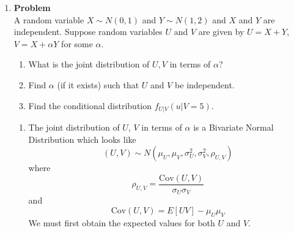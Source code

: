 \documentclass[12pt]{article}
\newenvironment{Ex}{\textbf{Problem}\vspace{.75em}\\}{}
\begin{document}
\begin{enumerate}
\begin{Ex}
\begin{solution}
\begin{enumerate}
\begin{equation}
\begin{aligned}
            &= \text{Var}(M_1 + \cdots + M_n) \\
            &= n\text{Var}(M) \\
            &= \left(\frac{q}{1-p}\right)
            \left(\frac{1}{\lambda^2}\right) \\
            \implies \text{Var}(Y|N=n) &= \frac{q}{(1-p)\lambda^2} \\
          \end{aligned}
        \end{equation}
      \end{enumerate}
    \end{solution}
  \end{Ex}
\item
  \begin{Ex}
    A random variable $X \sim N(0,1)$ and $Y \sim N(1,2)$ and $X$ and
    $Y$ are independent. Suppose random variables $U$ and $V$ are
    given by $U=X+Y$, $V=X+\alpha Y$ for some $\alpha$.
    \begin{enumerate}
    \item What is the joint distribution of $U,V$ in terms of
      $\alpha$?
    \item Find $\alpha$ (if it exists) such that $U$ and $V$ be
      independent.
    \item Find the conditional distribution $f_{U|V}(u|V = 5)$.
    \end{enumerate}
    \begin{solution} \hfill
      \begin{enumerate}
      \item The joint distribution of $U$, $V$ in terms of $\alpha$ is
        a Bivariate Normal Distribution which looks like
        \begin{equation}
          \label{eq:5a-biv-decl}
          (U,V) \sim N(\mu_U, \mu_V, \sigma_U^2, \sigma_V^2, \rho_{U,V})
        \end{equation}
        where
        \begin{equation}
          \label{eq:5a-rho-decl}
          \rho_{U,V} = \frac{\text{Cov}(U,V)}{\sigma_U \sigma_V}
        \end{equation}
        and
        \begin{equation}
          \label{eq:5a-cov-decl}
          \text{Cov}(U,V) = E[UV]-\mu_U \mu_V
        \end{equation}
        We must first obtain the expected values for both $U$ and
        $V$. \\
        \begin{tabularx}{.95\textwidth}{XX}

\end{tabularx}
\end{enumerate}
\end{solution}
\end{Ex}
\end{enumerate}
\end{document}
